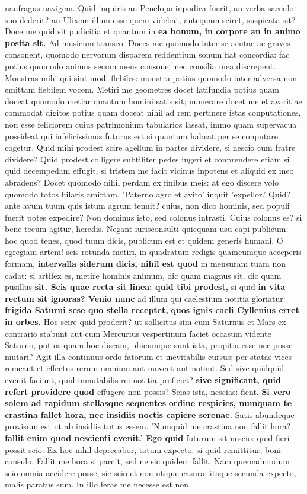naufragus navigem. Quid inquiris an Penelopa inpudica fuerit, an verba saeculo suo dederit? an Ulixem illum esse quem videbat, antequam sciret, suspicata sit? Doce me quid sit pudicitia et quantum in \textbf{ea bonum, in corpore an in animo posita sit.} Ad musicum transeo. Doces me quomodo inter se acutae ac graves consonent, quomodo nervorum disparem reddentium sonum fiat concordia: fac potius quomodo animus secum meus consonet nec consilia mea discrepent. Monstras mihi qui sint modi flebiles: monstra potius quomodo inter adversa non emittam flebilem vocem. Metiri me geometres docet latifundia potius quam doceat quomodo metiar quantum homini satis sit; numerare docet me et avaritiae commodat digitos potius quam doceat nihil ad rem pertinere istas conputationes, non esse feliciorem cuius patrimonium tabularios lassat, immo quam supervacua possideat qui infelicissimus futurus est si quantum habeat per se conputare cogetur. Quid mihi prodest scire agellum in partes dividere, si nescio cum fratre dividere? Quid prodest colligere subtiliter pedes iugeri et conprendere etiam si quid decempedam effugit, si tristem me facit vicinus inpotens et aliquid ex meo abradens? Docet quomodo nihil perdam ex finibus meis: at ego discere volo quomodo totos hilaris amittam. 'Paterno agro et avito' inquit 'expellor.' Quid? ante avum tuum quis istum agrum tenuit? cuius, non dico hominis, sed populi fuerit potes expedire? Non dominus isto, sed colonus intrasti. Cuius colonus es? si bene tecum agitur, heredis. Negant iurisconsulti quicquam usu capi publicum: hoc quod tenes, quod tuum dicis, publicum est et quidem generis humani. O egregiam artem! scis rotunda metiri, in quadratum redigis quamcumque acceperis formam, \textbf{intervalla siderum dicis, nihil est quod} in mensuram tuam non cadat: si artifex es, metire hominis animum, dic quam magnus sit, dic quam pusillus \textbf{sit. \textbf{Scis quae recta sit linea: quid tibi prodest,}} si quid \textbf{in vita rectum sit ignoras? Venio nunc} ad illum qui caelestium notitia gloriatur: \textbf{frigida Saturni sese quo stella receptet,} \textbf{quos ignis caeli Cyllenius erret in orbes.} Hoc scire quid proderit? ut sollicitus sim cum Saturnus et Mars ex contrario stabunt aut cum Mercurius vespertinum faciet occasum vidente Saturno, potius quam hoc discam, ubicumque sunt ista, propitia esse nec posse mutari? Agit illa continuus ordo fatorum et inevitabilis cursus; per statas vices remeant et effectus rerum omnium aut movent aut notant. Sed sive quidquid evenit faciunt, quid inmutabilis rei notitia proficiet? \textbf{sive significant, quid refert providere quod} effugere non possis? Scias ista, nescias: fient. \textbf{Si vero solem ad rapidum stellasque sequentes} \textbf{ordine \textbf{respicies, numquam te crastina \textbf{fallet} \textbf{hora, nec} insidiis noctis capiere} serenae.} Satis abundeque provisum est ut ab insidiis tutus essem. 'Numquid me crastina non fallit hora? \textbf{fallit \textbf{enim quod nescienti evenit.' Ego quid}} futurum sit nescio: quid fieri possit scio. Ex hoc nihil deprecabor, totum expecto: si quid remittitur, boni consulo. Fallit me hora si parcit, sed ne sic quidem fallit. Nam quemadmodum scio omnia accidere posse, sic scio et non utique casura; itaque secunda expecto, malis paratus sum. In illo feras me necesse est non 